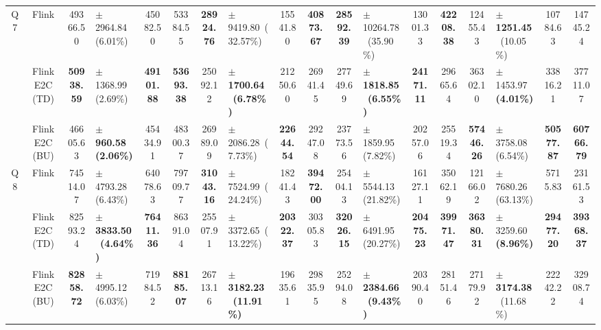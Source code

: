 \begin{tabular}{@{} c c c l c c c l c c c l c c c l c c @{}}
  \cmidrule(lr){1-18}
  \multirow{3}{*}{Q7} & Flink & \num{49366.50} & $\pm$ \num{2964.84}~(\num{6.01}\%) & \num{45082.50} & \num{53384.55} & {\bfseries \num{28924.76}} & $\pm$ \num{9419.80}~(\num{32.57}\%) & \num{15541.80} & {\bfseries \num{40873.67}} & {\bfseries \num{28592.39}} & $\pm$ \num{10264.78}~(\num{35.90}\%) & \num{13001.33} & {\bfseries \num{42208.38}} & \num{12455.43} & $\pm$ {\bfseries \num{1251.45}}~(\num{10.05}\%) & \num{10784.63} & \num{14745.24} \\
   & FlinkE2C (TD) & {\bfseries \num{50938.59}} & $\pm$ \num{1368.99}~(\num{2.69}\%) & {\bfseries \num{49101.88}} & {\bfseries \num{53693.38}} & \num{25092.12} & $\pm$ {\bfseries \num{1700.64}}~{\bfseries (\num{6.78}\%)} & \num{21250.60} & \num{26941.45} & \num{27749.69} & $\pm$ {\bfseries \num{1818.85}}~{\bfseries (\num{6.55}\%)} & {\bfseries \num{24171.11}} & \num{29665.64} & \num{36302.10} & $\pm$ \num{1453.97}~{\bfseries (\num{4.01}\%)} & \num{33816.21} & \num{37711.07} \\
   & FlinkE2C (BU) & \num{46605.63} & $\pm$ {\bfseries \num{960.58}}~{\bfseries (\num{2.06}\%)} & \num{45434.91} & \num{48300.37} & \num{26989.09} & $\pm$ \num{2086.28}~(\num{7.73}\%) & {\bfseries \num{22644.54}} & \num{29247.08} & \num{23773.56} & $\pm$ \num{1859.95}~(\num{7.82}\%) & \num{20257.06} & \num{25519.34} & {\bfseries \num{57446.26}} & $\pm$ \num{3758.08}~(\num{6.54}\%) & {\bfseries \num{50577.87}} & {\bfseries \num{60766.79}} \\
  \cmidrule(lr){1-18}
  \multirow{3}{*}{Q8} & Flink & \num{74514.07} & $\pm$ \num{4793.28}~(\num{6.43}\%) & \num{64078.63} & \num{79709.77} & {\bfseries \num{31043.16}} & $\pm$ \num{7524.99}~(\num{24.24}\%) & \num{18241.43} & {\bfseries \num{39472.00}} & \num{25404.13} & $\pm$ \num{5544.13}~(\num{21.82}\%) & \num{16127.11} & \num{35062.19} & \num{12166.02} & $\pm$ \num{7680.26}~(\num{63.13}\%) & \num{5715.83} & \num{23161.53} \\
   & FlinkE2C (TD) & \num{82593.24} & $\pm$ {\bfseries \num{3833.50}}~{\bfseries (\num{4.64}\%)} & {\bfseries \num{76411.36}} & \num{86391.04} & \num{25507.91} & $\pm$ \num{3372.65}~(\num{13.22}\%) & {\bfseries \num{20322.37}} & \num{30305.83} & {\bfseries \num{32026.15}} & $\pm$ \num{6491.95}~(\num{20.27}\%) & {\bfseries \num{20475.23}} & {\bfseries \num{39971.47}} & {\bfseries \num{36380.31}} & $\pm$ \num{3259.60}~{\bfseries (\num{8.96}\%)} & {\bfseries \num{29477.20}} & {\bfseries \num{39368.37}} \\
   & FlinkE2C (BU) & {\bfseries \num{82858.72}} & $\pm$ \num{4995.12}~(\num{6.03}\%) & \num{71984.52} & {\bfseries \num{88185.07}} & \num{26713.16} & $\pm$ {\bfseries \num{3182.23}}~{\bfseries (\num{11.91}\%)} & \num{19635.61} & \num{29835.95} & \num{25294.08} & $\pm$ {\bfseries \num{2384.66}}~{\bfseries (\num{9.43}\%)} & \num{20390.40} & \num{28151.46} & \num{27179.92} & $\pm$ {\bfseries \num{3174.38}}~(\num{11.68}\%) & \num{22242.22} & \num{32908.74} \\
  \bottomrule
\end{tabular}
